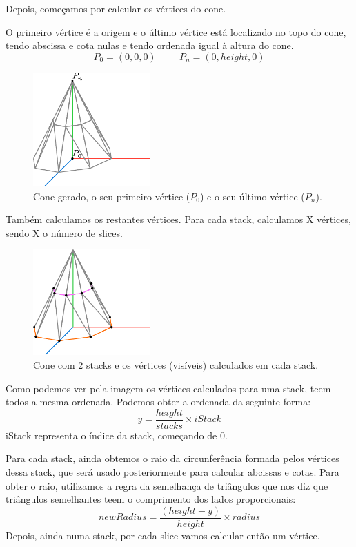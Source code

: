 \documentclass[12pt, a4paper]{article}
\begin{document}
Depois, começamos por calcular os vértices do cone.

O primeiro vértice é a origem e o último vértice está localizado no topo do cone,
tendo abscissa e cota nulas e tendo ordenada igual à altura do cone.
$$
P_0 = (0, 0, 0)
\hspace{1cm}
P_n = (0, height, 0)
$$

\begin{figure}[H]
    \centering
    \includegraphics[width=0.4\textwidth]{res/figures/Cone1.pdf}
    \caption{
        Cone gerado, o seu primeiro vértice ($P_0$) e o seu último vértice ($P_n$).
    }
\end{figure}

Também calculamos os restantes vértices. Para cada stack, calculamos X
vértices, sendo X o número de slices.

\begin{figure}[H]
    \centering
    \includegraphics[width=0.4\textwidth]{res/figures/Cone2.pdf}
    \caption{
        Cone com 2 stacks e os vértices (visíveis) calculados em cada stack.
    }
\end{figure}

Como podemos ver pela imagem os vértices calculados para uma stack,
teem todos a mesma ordenada. Podemos obter a ordenada da seguinte forma:
$$
y = \frac{height}{stacks} \times iStack
$$
iStack representa o índice da stack, começando de 0.

Para cada stack, ainda obtemos o raio da circunferência formada pelos vértices dessa stack,
que será usado posteriormente para calcular abcissas e cotas.
Para obter o raio, utilizamos a regra da semelhança de triângulos que nos diz que triângulos
semelhantes teem o comprimento dos lados proporcionais:
$$
newRadius = \frac{(height - y)}{height}\times radius
$$
Depois, ainda numa stack, por cada slice vamos calcular então um vértice.
\end{document}
